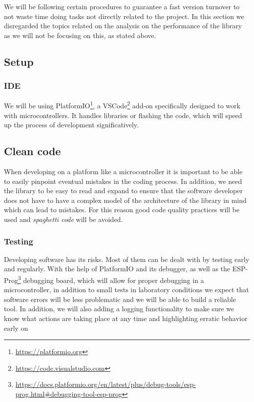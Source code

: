 We will be following certain procedures to guarantee a fast version turnover to not waste time doing tasks not directly related to the project. In this section we disregarded the topics related on the analysis on the performance of the library as we will not be focusing on this, as stated above. 

\subsection{Setup}
\subsubsection{IDE}
We will be using PlatformIO\footnote{\url{https://platformio.org}}, a VSCode\footnote{\url{https://code.visualstudio.com}} add-on specifically designed to work with microcontrollers. It handles libraries or flashing the code, which will speed up the process of development significatively.


\subsection{Clean code}
When developing on a platform like a microcontroller it is important to be able to easily pinpoint eventual mistakes in the coding process. In addition, we need the library to be easy to read and expand to ensure that the software developer does not have to have a complex model of the architecture of the library in mind which can lead to mistakes. For this reason good code quality practices will be used and \textit{spaghetti code} will be avoided.

\subsubsection{Testing}
Developing software has its risks. Most of them can be dealt with by testing early and regularly. With the help of PlatformIO and its debugger, as well as the ESP-Prog\footnote{\url{https://docs.platformio.org/en/latest/plus/debug-tools/esp-prog.html\#debugging-tool-esp-prog}} debugging board, which will allow for proper debugging in a microcontroller, in addition to small tests in laboratory conditions we expect that software errors will  be less problematic and we will be able to build a reliable tool. In addition, we will also adding a logging functionality to make sure we know what actions are taking place at any time and highlighting erratic behavior early on
